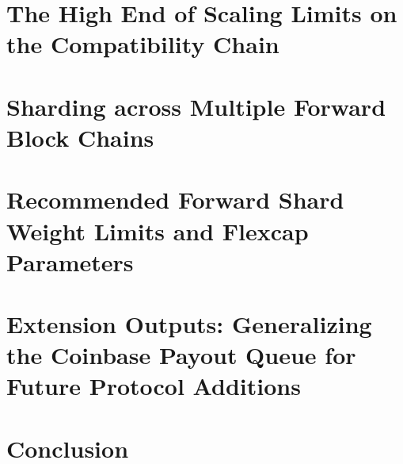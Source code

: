 \documentclass[letterpaper, 10 pt, conference]{ieeeconf}
\begin{document}
\section{The High End of Scaling Limits on the Compatibility Chain} \label{hardlimits}


\section{Sharding across Multiple Forward Block Chains} \label{sharding}


\section{Recommended Forward Shard Weight Limits and Flexcap Parameters} \label{parameters}


\section{Extension Outputs: Generalizing the Coinbase Payout Queue for Future Protocol Additions} \label{extensionoutputs}


\section{Conclusion} \label{conclusion}






{}

\end{document}
